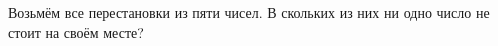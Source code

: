 \question
Возьмём все перестановки из пяти чисел. В скольких из них ни одно число не стоит на своём месте?

